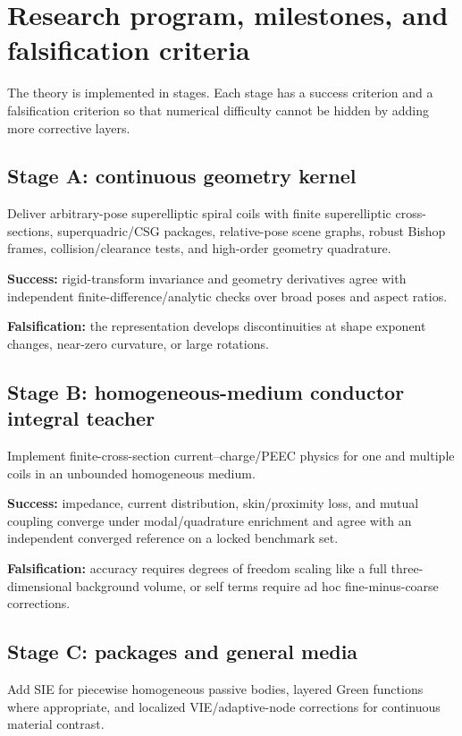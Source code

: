 \section{Research program, milestones, and falsification criteria}

The theory is implemented in stages. Each stage has a success criterion and a
falsification criterion so that numerical difficulty cannot be hidden by adding
more corrective layers.

\subsection{Stage A: continuous geometry kernel}

Deliver arbitrary-pose superelliptic spiral coils with finite superelliptic
cross-sections, superquadric/CSG packages, relative-pose scene graphs, robust
Bishop frames, collision/clearance tests, and high-order geometry quadrature.

\textbf{Success:} rigid-transform invariance and geometry derivatives agree with
independent finite-difference/analytic checks over broad poses and aspect
ratios.

\textbf{Falsification:} the representation develops discontinuities at shape
exponent changes, near-zero curvature, or large rotations.

\subsection{Stage B: homogeneous-medium conductor integral teacher}

Implement finite-cross-section current--charge/PEEC physics for one and multiple
coils in an unbounded homogeneous medium.

\textbf{Success:} impedance, current distribution, skin/proximity loss, and
mutual coupling converge under modal/quadrature enrichment and agree with an
independent converged reference on a locked benchmark set.

\textbf{Falsification:} accuracy requires degrees of freedom scaling like a full
three-dimensional background volume, or self terms require ad hoc
fine-minus-coarse corrections.

\subsection{Stage C: packages and general media}

Add SIE for piecewise homogeneous passive bodies, layered Green functions where
appropriate, and localized VIE/adaptive-node corrections for continuous
material contrast.

